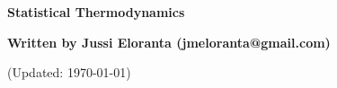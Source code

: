 \documentclass[serif]{beamer}
\begin{document}
\phantom{hauki}
\vfill
\begin{center}
\textbf{Statistical Thermodynamics}\\

\vspace{1cm}

\textbf{Written by Jussi Eloranta (jmeloranta@gmail.com)}\\

\vspace{1cm}

{\tiny (Updated: \today)}

\end{center}
\vfill
\newpage




%
%
%
%
%
%
%

%
\end{document}
